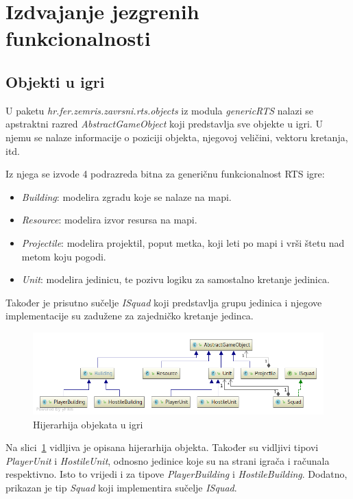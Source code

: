 \documentclass[times, utf8, zavrsni, numeric]{fer}
\begin{document}
\section{Izdvajanje jezgrenih funkcionalnosti}

\subsection{Objekti u igri}

\par U paketu \textit{hr.fer.zemris.zavrsni.rts.objects} iz modula \textit{genericRTS} nalazi se apstraktni razred \textit{AbstractGameObject} koji predstavlja sve objekte u igri.
U njemu se nalaze informacije o poziciji objekta, njegovoj veličini, vektoru kretanja, itd.

\par Iz njega se izvode 4 podrazreda bitna za generičnu funkcionalnost RTS igre:
\begin{itemize}
	\item \textit{Building}: modelira zgradu koje se nalaze na mapi.
	\item \textit{Resource}: modelira izvor resursa na mapi.
	\item \textit{Projectile}: modelira projektil, poput metka, koji leti po mapi i vrši štetu nad metom koju pogodi.
	\item \textit{Unit}: modelira jedinicu, te pozivu logiku za samostalno kretanje jedinica. 
\end{itemize}
Također je prisutno sučelje \textit{ISquad} koji predstavlja grupu jedinica i njegove implementacije su zadužene za zajedničko kretanje jedinca.

\begin{figure}[h]
	\centering
	\includegraphics[width=0.8\linewidth]{images/umlObjects.png}
	\caption{Hijerarhija objekata u igri}
	\label{fig:umlObjects}
\end{figure}

\par Na slici~\ref{fig:umlObjects} vidljiva je opisana hijerarhija objekta.
Također su vidljivi tipovi \textit{PlayerUnit} i \textit{HostileUnit}, odnosno jedinice koje su na strani igrača i računala respektivno.
Isto to vrijedi i za tipove \textit{PlayerBuilding} i \textit{HostileBuilding}.
Dodatno, prikazan je tip \textit{Squad} koji implementira sučelje \textit{ISquad}.
\end{document}
